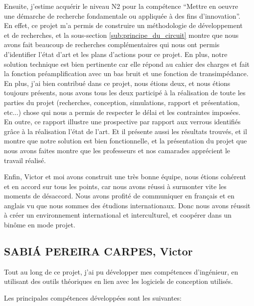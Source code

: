 \documentclass[a4paper,12pt]{article}
\newcommand{\aspas}[1]{``#1''}
\numberwithin{equation}{section}
\newcommand{\?}{\stackrel{?}{=}}
\begin{document}
Ensuite, j'estime acquérir le niveau N2 pour la compétence \aspas{Mettre en oeuvre une démarche de recherche fondamentale ou appliquée à des fins d'innovation}. En effet, ce projet m'a permis de construire un méthodologie de développement et de recherches, et la sous-section \ref{sub:principe_du_circuit} montre que nous avons fait beaucoup de recherches complémentaires qui nous ont permis d'identifier l'état d'art et les plans d'actions pour ce projet. En plus, notre solution technique est bien pertinente car elle répond au cahier des charges et fait la fonction préamplification avec un bas bruit et une fonction de transimpédance. En plus, j'ai bien contribué dans ce projet, nous étions deux, et nous étions toujours présents, nous avons tous les deux participé à la réalisation de toute les parties du projet (recherches, conception, simulations, rapport et présentation, etc...) chose qui nous a permis de respecter le délai et les contraintes imposées. En outre, ce rapport illustre une prospective par rapport aux verrous identifiés grâce à la réalisation l'état de l'art. Et il présente aussi les résultats trouvés, et il montre que notre solution est bien fonctionnelle, et la présentation du projet que nous avons faites montre que les professeurs et nos camarades apprécient le travail réalisé. 

Enfin, Victor et moi avons construit une très bonne équipe, nous étions cohérent et en accord sur tous les points, car nous avons réussi à surmonter vite les moments de désaccord. Nous avons profité de communiquer en français et en anglais vu que nous sommes des étudions internationaux. Donc nous avons réussit à créer un environnement international et interculturel, et coopérer dans un binôme en mode projet. 

\subsection{SABIÁ PEREIRA CARPES, Victor}

Tout au long de ce projet, j'ai pu développer mes compétences d'ingénieur, en utilisant des outils théoriques en lien avec les logiciels de conception utilisés.

Les principales compétences développées sont les suivantes:
\end{document}
